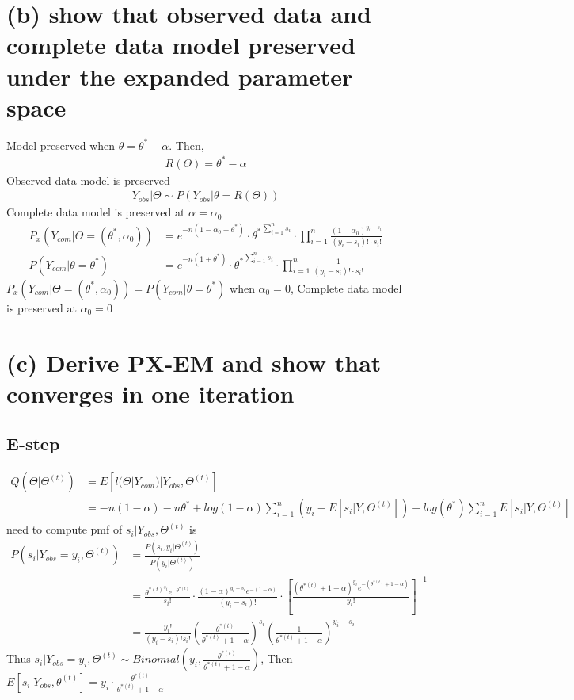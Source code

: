 \documentclass[11pt]{article}
\begin{document}
\section*{(b) show that observed data and complete data model preserved under the expanded parameter space}
Model preserved when $\theta = \theta^* -\alpha$. Then,
\begin{align*}
R(\Theta) = \theta^* -\alpha
\end{align*}
Observed-data model is preserved
\begin{align*}
Y_{obs}|\Theta \sim P(Y_{obs} | \theta = R(\Theta))
\end{align*}
Complete data model is preserved at $\alpha=\alpha_0$
\begin{align*}
P_x(Y_{com}|\Theta = (\theta^*,\alpha_0)) &= e^{-n(1-\alpha_0+\theta^*)} \cdot {\theta^*}^{\sum_{i=1}^{n}s_i} \cdot \prod_{i=1}^{n}\frac{(1-\alpha_0)^{y_i-s_i}}{(y_i-s_i)! \cdot s_i!}\\
P(Y_{com}|\theta =\theta^*)&= e^{-n(1+\theta^*)} \cdot {\theta^*}^{\sum_{i=1}^{n}s_i} \cdot \prod_{i=1}^{n}\frac{1}{(y_i-s_i)! \cdot s_i!}
\end{align*}
$P_x(Y_{com}|\Theta = (\theta^*,\alpha_0)) = P(Y_{com}|\theta =\theta^*)$ when $\alpha_0 = 0$, Complete data model is preserved at $\alpha_0=0$
\section*{(c) Derive PX-EM and show that converges in one iteration}
\subsection{E-step}
\begin{align*}
Q(\Theta| \Theta^{(t)}) &= E [l(\Theta | Y_{com})| Y_{obs}, \Theta^{(t)}]\\
&=-n(1-\alpha) -n\theta^* + log(1-\alpha) \sum_{i=1}^{n}(y_i-E \left[s_i | Y, \Theta^{(t)} \right]) + log(\theta^*)\sum_{i=1}^{n}E \left[s_i | Y, \Theta^{(t)} \right]
\end{align*}
need to compute pmf of $s_i|Y_{obs},\Theta^{(t)}$ is
\begin{align*}
P(s_i|Y_{obs}=y_i,\Theta^{(t)}) &= \frac{P(s_i,y_i|\Theta^{(t)})}{P(y_i|\Theta^{(t)})}\\
&= \frac{{\theta^{*(t)}}^{s_i} e^{-\theta^{*(t)}}}{s_i!} \cdot \frac{(1-\alpha)^{y_i-s_i}e^{-(1-\alpha)}}{(y_i-s_i)!} \cdot \left[ \frac{(\theta^{*(t)}+1-\alpha)^{y_i} e ^{-(\theta^{*(t)} + 1-\alpha)}}{y_i !}\right]^{-1}\\
&= \frac{y_i!}{(y_i-s_i)!s_i!} \left(\frac{\theta^{*(t)}}{\theta^{*(t)} +1-\alpha}\right)^{s_i} \left(\frac{1}{\theta^{*(t)} +1-\alpha}\right)^{y_i - s_i}
\end{align*}
Thus $s_i|Y_{obs}=y_i,\Theta^{(t)} \sim Binomial\left(y_i,\frac{\theta^{*(t)}}{\theta^{*(t)} + 1 -\alpha}\right)$, Then $E[s_i| Y_{obs}, \theta^{(t)}]= y_i\cdot\frac{\theta^{*(t)}}{\theta^{*(t)} + 1 -\alpha}$
\end{document}
